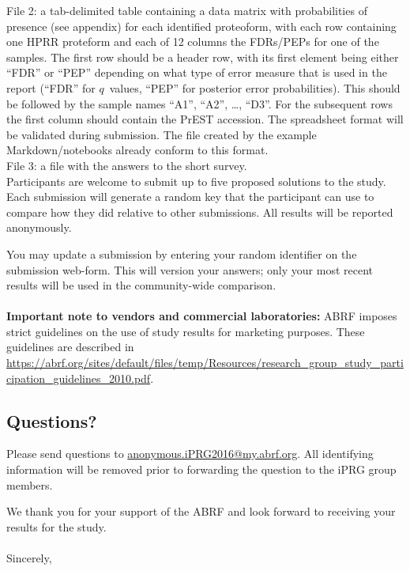 \documentclass[a4paper,12pt]{article}
\begin{document}
File 2:  a tab-delimited table containing a data matrix with probabilities of presence (see appendix) for each identified proteoform, with each row containing one HPRR proteform and each of 12 columns the FDRs/PEPs for one of the samples. The first row should be a header row, with its first element being either ``FDR'' or ``PEP'' depending on what type of error measure that is used in the report (``FDR'' for $q$~values, ``PEP'' for posterior error probabilities). This should be followed by the sample names ``A1'', ``A2'', \ldots, ``D3''. For the subsequent rows the first column should contain the PrEST accession. The spreadsheet format will be validated during submission. The file created by the example Markdown/notebooks already conform to this format.\\

File 3: a file with the answers to the short survey.\\

Participants are welcome to submit up to five proposed solutions to the study. Each submission will generate a random key that the participant can use to compare how they did relative to other submissions. All results will be reported anonymously.

You may update a submission by entering your random identifier on the submission web-form. This will version your answers; only your most recent results will be used in the community-wide comparison. \\
\\

\textbf{Important note to vendors and commercial laboratories:} ABRF imposes strict guidelines on the use of study results for marketing purposes. These guidelines are described in \url{https://abrf.org/sites/default/files/temp/Resources/research_group_study_participation_guidelines_2010.pdf}.

\subsection*{Questions?}
 Please send questions to \url{anonymous.iPRG2016@my.abrf.org}. All identifying information will be removed prior to forwarding the question to the iPRG group members.

We thank you for your support of the ABRF and look forward to receiving your results for the study.\\
\\

Sincerely,
 
\end{document}
